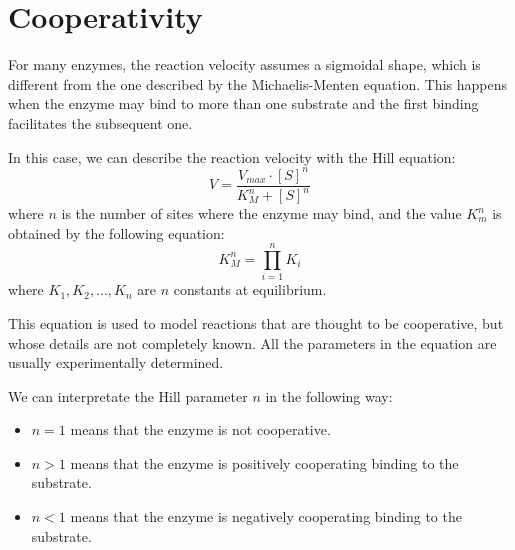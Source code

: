 \section{Cooperativity}
For many enzymes, the reaction velocity assumes a sigmoidal shape, which is 
different from the one described by the Michaelis-Menten equation. This happens 
when the enzyme may bind to more than one substrate and the first binding facilitates
the subsequent one.

In this case, we can describe the reaction velocity with the Hill equation:
\begin{equation}
    V = \frac{V_{max} \cdot [S]^n}{K_M^n + [S]^n}
\end{equation}
where $n$ is the number of sites where the enzyme may bind, and the value $K_m^n$
is obtained by the following equation:
\begin{equation}
    K_M^n = \prod_{i = 1}^n K_i
\end{equation}
where $K_1, K_2, \ldots, K_n$ are $n$ constants at equilibrium.

This equation is used to model reactions that are thought to be cooperative, but 
whose details are not completely known. All the parameters in the equation are 
usually experimentally determined.

We can interpretate the Hill parameter $n$ in the following way:
\begin{itemize}
    \item $n = 1$ means that the enzyme is not cooperative.
    \item $n > 1$ means that the enzyme is positively cooperating binding to the 
          substrate.
    \item $n < 1$ means that the enzyme is negatively cooperating binding to the
            substrate.
\end{itemize}

